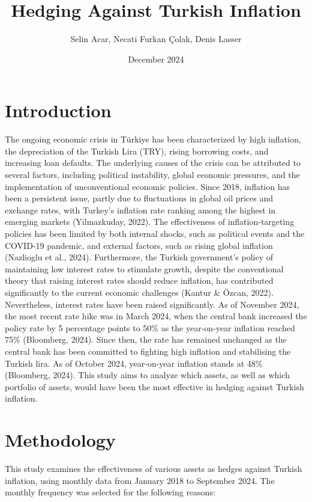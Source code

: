 \documentclass[
]{article}
\title{Hedging Against Turkish Inflation}
\author{Selin Acar, Necati Furkan Çolak, Denis Lasser}
\date{December 2024}
\begin{document}
\maketitle

{
\setcounter{tocdepth}{2}
\tableofcontents
}
\pagebreak

\section{Introduction}\label{introduction}

The ongoing economic crisis in Türkiye has been characterized by high
inflation, the depreciation of the Turkish Lira (TRY), rising borrowing
costs, and increasing loan defaults. The underlying causes of the crisis
can be attributed to several factors, including political instability,
global economic pressures, and the implementation of unconventional
economic policies. Since 2018, inflation has been a persistent issue,
partly due to fluctuations in global oil prices and exchange rates, with
Turkey's inflation rate ranking among the highest in emerging markets
(Yilmazkuday, 2022). The effectiveness of inflation-targeting policies
has been limited by both internal shocks, such as political events and
the COVID-19 pandemic, and external factors, such as rising global
inflation (Nazlioglu et al., 2024). Furthermore, the Turkish
government's policy of maintaining low interest rates to stimulate
growth, despite the conventional theory that raising interest rates
should reduce inflation, has contributed significantly to the current
economic challenges (Kantur \& Özcan, 2022). Nevertheless, interest
rates have been raised significantly. As of November 2024, the most
recent rate hike was in March 2024, when the central bank increased the
policy rate by 5 percentage points to 50\% as the year-on-year inflation
reached 75\% (Bloomberg, 2024). Since then, the rate has remained
unchanged as the central bank has been committed to fighting high
inflation and stabilising the Turkish lira. As of October 2024,
year-on-year inflation stands at 48\% (Bloomberg, 2024). This study aims
to analyze which assets, as well as which portfolio of assets, would
have been the most effective in hedging against Turkish inflation.

\section{Methodology}\label{methodology}

This study examines the effectiveness of various assets as hedges
against Turkish inflation, using monthly data from January 2018 to
September 2024. The monthly frequency was selected for the following
reasons:
\end{document}
